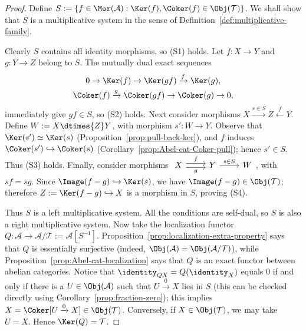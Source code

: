 \begin{proof}
Define
$S:=\left\{f\in\Mor(\mathcal{A}):\Ker(f),\Coker(f)\in\Obj(\mathcal{T})\right\}$.
We shall show that $S$ is a multiplicative system in the sense of
Definition~\ref{def:multiplicative-family}.

Clearly $S$ contains all identity morphisms, so (S1) holds. Let $f:X\to Y$
and $g:Y\to Z$ belong to $S$. The mutually dual exact sequences
\begin{gather*}
	0\to\Ker(f)\to\Ker(gf)\xrightarrow{f}\Ker(g),\\
	\Coker(f)\xrightarrow{g}\Coker(gf)\to\Coker(g)\to0,
\end{gather*}
immediately give $gf\in S$, so (S2) holds. Next consider morphisms
$X\xrightarrow{s\in S}Z\xleftarrow{f}Y$. Define
$W:=X\dtimes{Z}Y$, with morphism $s':W\to Y$. Observe that
$\Ker(s')\simeq\Ker(s)$ (Proposition~\ref{prop:pull-back-ker}), and $f$
induces $\Coker(s')\hookrightarrow\Coker(s)$
(Corollary~\ref{prop:Abel-cat-Coker-pull}); hence $s'\in S$. Thus (S3) holds.
Finally, consider morphisms
$\begin{tikzcd}
	X \arrow[r, "f", shift left] \arrow[r, "g"', shift right] &
	Y \arrow[r, "s \in S"] & W
\end{tikzcd}$,
with $sf=sg$. Since $\Image(f-g)\hookrightarrow\Ker(s)$, we have
$\Image(f-g)\in\Obj(\mathcal{T})$; therefore
$Z:=\Ker(f-g)\hookrightarrow X$ is a morphism in $S$, proving (S4).

Thus $S$ is a left multiplicative system. All the conditions are self-dual,
so $S$ is also a right multiplicative system. Now take the localization
functor
$Q:\mathcal{A}\to\mathcal{A}/\mathcal{T}:=\mathcal{A}[S^{-1}]$.
Proposition~\ref{prop:localization-extra-property} says that $Q$ is
essentially surjective (indeed,
$\Obj(\mathcal{A})=\Obj(\mathcal{A}/\mathcal{T})$), while
Proposition~\ref{prop:Abel-cat-localization} says that $Q$ is an exact functor
between abelian categories. Notice that
$\identity_{QX}=Q(\identity_X)$ equals $0$ if and only if there is a
$U\in\Obj(\mathcal{A})$ such that $U\xrightarrow{0}X$ lies in $S$ (this can
be checked directly using Corollary~\ref{prop:fraction-zero}); this implies
$X=\Coker[U\xrightarrow{0}X]\in\Obj(\mathcal{T})$. Conversely, if
$X\in\Obj(\mathcal{T})$, we may take $U=X$. Hence
$\Ker(Q)=\mathcal{T}$.


\end{proof}
